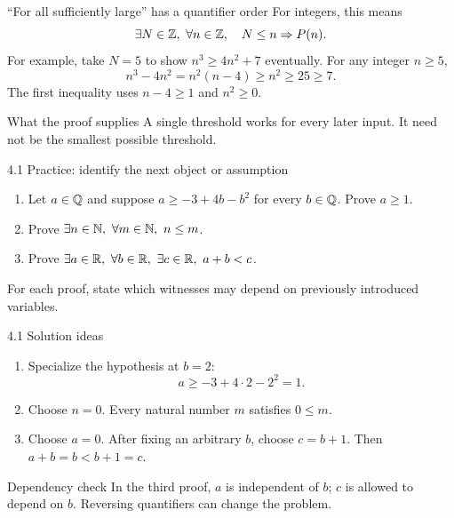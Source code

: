 \begin{frame}{``For all sufficiently large'' has a quantifier order}
For integers, this means
\[
\exists N\in\Z,\ \forall n\in\Z,\quad N\le n\Rightarrow P(n).
\]
For example, take $N=5$ to show $n^3\ge4n^2+7$ eventually.
For any integer $n\ge5$,
\[
n^3-4n^2=n^2(n-4)\ge n^2\ge25\ge7.
\]
The first inequality uses $n-4\ge1$ and $n^2\ge0$.
\begin{block}{What the proof supplies}
A single threshold works for every later input. It need not be the smallest possible threshold.
\end{block}
\end{frame}

\begin{frame}{4.1 Practice: identify the next object or assumption}
\begin{enumerate}
\item Let $a\in\mathbb{Q}$ and suppose $a\ge -3+4b-b^2$ for every $b\in\mathbb{Q}$. Prove $a\ge1$.
\item Prove $\exists n\in\mathbb{N},\ \forall m\in\mathbb{N},\ n\le m$.
\item Prove $\exists a\in\mathbb{R},\ \forall b\in\mathbb{R},\ \exists c\in\mathbb{R},\ a+b<c$.
\end{enumerate}
\vspace{3mm}
For each proof, state which witnesses may depend on previously introduced variables.
\end{frame}

\begin{frame}{4.1 Solution ideas}
\begin{enumerate}
\item Specialize the hypothesis at $b=2$:
\[
a\ge -3+4\cdot2-2^2=1.
\]
\item Choose $n=0$. Every natural number $m$ satisfies $0\le m$.
\item Choose $a=0$. After fixing an arbitrary $b$, choose $c=b+1$. Then $a+b=b<b+1=c$.
\end{enumerate}
\begin{block}{Dependency check}
In the third proof, $a$ is independent of $b$; $c$ is allowed to depend on $b$. Reversing quantifiers can change the problem.
\end{block}
\end{frame}

